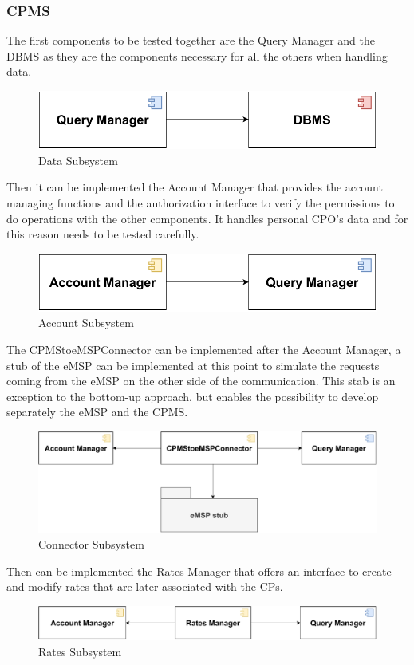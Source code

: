\subsubsection{CPMS}
The first components to be tested together are the Query Manager and the DBMS as they are the
components necessary for all the others when handling data.
\begin{figure}[H]
    \centering
    \includegraphics[scale=0.6]{src/Integration/CPMS_Query.pdf}
    \caption{Data Subsystem}
\end{figure}
Then it can be implemented the Account Manager that provides the account managing functions and the authorization interface 
to verify the permissions to do operations with the other components. It handles personal CPO's data and for this reason needs
to be tested carefully.
\begin{figure}[H]
    \centering
    \includegraphics[scale=0.6]{src/Integration/CPMS_Account.pdf}
    \caption{Account Subsystem}
\end{figure}
The CPMStoeMSPConnector can be implemented after the Account Manager, a stub of the eMSP can be implemented at this point to simulate
the requests coming from the eMSP on the other side of the communication. This stab is an exception to the bottom-up approach, but
enables the possibility to develop separately the eMSP and the CPMS. 
\begin{figure}[H]
    \centering
    \includegraphics[scale=0.6]{src/Integration/CPMS_Connector.pdf}
    \caption{Connector Subsystem}
\end{figure}
Then can be implemented the Rates Manager that offers an interface to create and modify rates that
are later associated with the CPs.
\begin{figure}[H]
    \centering
    \includegraphics[scale=0.6]{src/Integration/CPMS_Rates.pdf}
    \caption{Rates Subsystem}
\end{figure}



